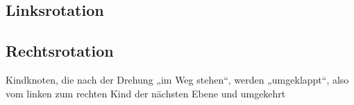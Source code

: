\documentclass{lehramt-informatik-haupt}
\begin{document}
%

\subsection{Linksrotation}


%

\subsection{Rechtsrotation}


Kindknoten, die nach der Drehung „im Weg stehen“, werden „umgeklappt“,
also vom linken zum rechten Kind der nächsten Ebene und umgekehrt


\literatur
\end{document}
